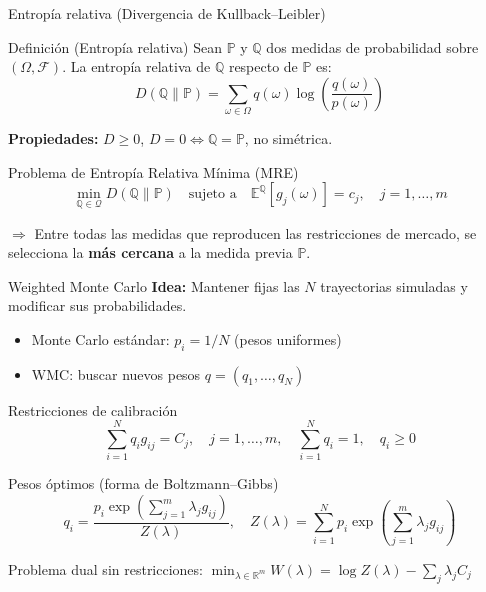 \documentclass[8pt]{beamer}
\begin{document}
\begin{frame}{Entropía relativa (Divergencia de Kullback--Leibler)}
    \begin{block}{Definición (Entropía relativa)}
        Sean $\mathbb{P}$ y $\mathbb{Q}$ dos medidas de probabilidad sobre $(\Omega,\mathcal{F})$. La entropía relativa de $\mathbb{Q}$ respecto de $\mathbb{P}$ es:
        \[
            D(\mathbb{Q}\|\mathbb{P}) = \sum_{\omega\in\Omega} q(\omega)\log\left(\frac{q(\omega)}{p(\omega)}\right)
        \]
    \end{block}
    \pause
    
    \textbf{Propiedades:} $D \geq 0$, $D = 0 \Leftrightarrow \mathbb{Q} = \mathbb{P}$, no simétrica.
    \pause
    
    \vspace{0.3cm}
    \begin{block}{Problema de Entropía Relativa Mínima (MRE)}
        \[
            \min_{\mathbb{Q}\in\mathcal{Q}} D(\mathbb{Q}\|\mathbb{P}) \quad \text{sujeto a} \quad \mathbb{E}^\mathbb{Q}[g_j(\omega)] = c_j, \quad j=1,\ldots,m
        \]
    \end{block}
    \pause
    
    \vspace{0.2cm}
    $\Longrightarrow$ Entre todas las medidas que reproducen las restricciones de mercado, se selecciona la \textbf{más cercana} a la medida previa $\mathbb{P}$.
\end{frame}

\begin{frame}{Weighted Monte Carlo}
    \textbf{Idea:} Mantener fijas las $N$ trayectorias simuladas y modificar sus probabilidades.
    \pause
    
    \vspace{0.2cm}
    \begin{itemize}
        \item Monte Carlo estándar: $p_i = 1/N$ (pesos uniformes)
        \item WMC: buscar nuevos pesos $q = (q_1,\ldots,q_N)$
    \end{itemize}
    \pause
    
    \begin{block}{Restricciones de calibración}
        \[
            \sum_{i=1}^N q_i g_{ij} = C_j, \quad j=1,\ldots,m, \quad \sum_{i=1}^N q_i = 1, \quad q_i \geq 0
        \]
    \end{block}
    \pause
    
    \begin{block}{Pesos óptimos (forma de Boltzmann--Gibbs)}
        \[
            q_i = \frac{p_i\exp\left(\sum_{j=1}^m \lambda_j g_{ij}\right)}{Z(\lambda)}, \quad Z(\lambda) = \sum_{i=1}^N p_i\exp\left(\sum_{j=1}^m \lambda_j g_{ij}\right)
        \]
    \end{block}
    \pause
    
    Problema dual sin restricciones: $\displaystyle\min_{\lambda\in\mathbb{R}^m} W(\lambda) = \log Z(\lambda) - \sum_{j} \lambda_j C_j$
\end{frame}
\end{document}
